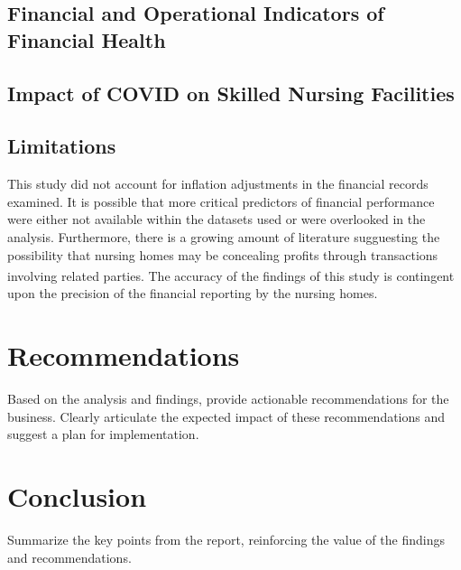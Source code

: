 \documentclass{article}
\theoremstyle{mytheoremstyle}
\theoremstyle{mytheoremstyle}
\theoremstyle{myproblemstyle}
\begin{document}
\subsection{Financial and Operational Indicators of Financial Health}

\subsection{Impact of COVID on Skilled Nursing Facilities}


\subsection{Limitations}

This study did not account for inflation adjustments in the financial records examined. It is possible that more critical predictors of financial performance were either not available within the datasets used or were overlooked in the analysis. Furthermore, there is a growing amount of literature sugguesting the possibility that nursing homes may be concealing profits through transactions involving related parties\textsuperscript{\cite{harrington2024united}}. The accuracy of the findings of this study is contingent upon the precision of the financial reporting by the nursing homes.


\pagebreak
\section{Recommendations}
Based on the analysis and findings, provide actionable recommendations for the business. Clearly articulate the expected impact of these recommendations and suggest a plan for implementation.

\pagebreak
\section{Conclusion}
Summarize the key points from the report, reinforcing the value of the findings and recommendations.

\pagebreak
\end{document}

